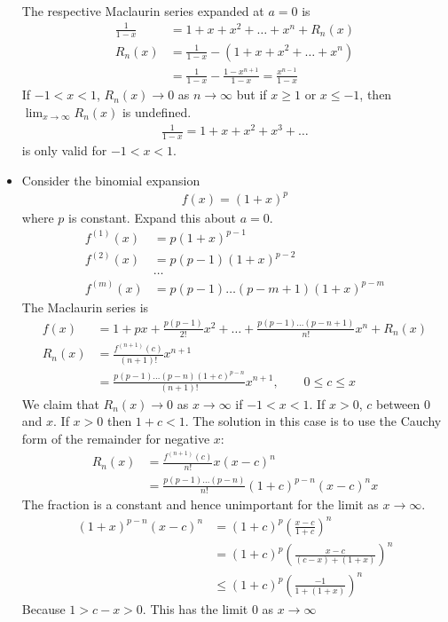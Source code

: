 \begin{ex}
\begin{itemize}
\begin{align*}
	\end{align*}
	The respective Maclaurin series expanded at $a=0$ is
	\begin{align*}
		\frac 1 {1-x} & = 1 + x + x^2 + \dots + x^n + R_n(x) \\
		R_n(x) & = \frac 1 {1-x} - \left( 1 +x + x^2 + \dots + x^n \right) \\
			& = \frac 1 {1-x} - \frac{1-x^{n+1}}{1-x} = \frac{x^{n-1}}{1-x}
	\end{align*}
	If $-1 < x < 1$, $R_n(x) \to 0$ as $n \to \infty$ but if $x \ge 1$ or $x \le -1$, then $\lim_{x \to \infty} R_n(x)$ is undefined.
	\begin{align*}
		\frac{1}{1-x} = 1+ x + x^2 + x^3 + \dots
	\end{align*}	
	is only valid for $-1<x<1$.
	\item
	Consider the binomial expansion
	\begin{align*}
	f(x) = (1+x)^p
	\end{align*}
	where $p$ is constant. Expand this about $a=0$.
	\begin{align*}
	f^{(1)}(x) & = p(1+x)^{p-1} \\
	f^{(2)}(x) & = p(p-1)(1+x)^{p-2} \\
	& \dots \\
	f^{(m)}(x) & = p(p-1)\dots (p-m+1)(1+x)^{p-m}
	\end{align*}
	The Maclaurin series is
	\begin{align*}
	f(x) & = 1 + px+ \frac{p(p-1)}{2!} x^2 + \dots + \frac{p(p-1) \dots (p-n+1)}{n!} x^n + R_n(x) \\
	R_n(x) & = \frac{f^{(n+1)}(c)}{(n+1)!} x^{n+1} \\
	& = \frac{p(p-1) \dots (p-n) (1+c)^{p-n} }{(n+1)!} x^{n+1}, \qquad 0 \le c \le x
	\end{align*}
	We claim that $R_n(x) \to 0$ as $x \to \infty$ if $-1<x<1$.
	If $x> 0$, $c$ between 0 and $x$. If $x>0$ then $1+c<1$. The solution in this case is to use the Cauchy form of the remainder for negative $x$:
	\begin{align*}
	R_n(x) & = \frac{f^{(n+1)}(c)}{n!} x(x-c)^n \\
	& = \frac{p(p-1) \dots (p-n)}{n!} (1+c)^{p-n} (x-c)^n x 
	\end{align*}
	The fraction is a constant and hence unimportant for the limit as $x \to \infty$.
	\begin{align*}
	(1+x)^{p-n} (x-c)^n & = (1+c)^p \left( \frac{x-c}{1+c} \right)^n \\
	& = (1+c)^p  \left( \frac{x-c}{(c-x)+(1+x)} \right) ^n \\
	& \le (1+c)^p  \left( \frac{-1}{1+(1+x)} \right) ^n 
	\end{align*}
	Because $1> c-x > 0$. This has the limit 0 as $x \to \infty$ 
\end{itemize}
\end{ex}



